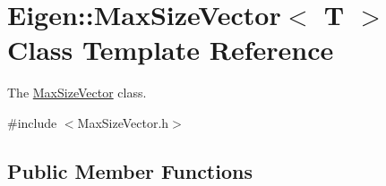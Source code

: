 \hypertarget{class_eigen_1_1_max_size_vector}{}\section{Eigen\+:\+:Max\+Size\+Vector$<$ T $>$ Class Template Reference}
\label{class_eigen_1_1_max_size_vector}


The \hyperlink{class_eigen_1_1_max_size_vector}{Max\+Size\+Vector} class.  




{\ttfamily \#include $<$Max\+Size\+Vector.\+h$>$}

\subsection*{Public Member Functions}

